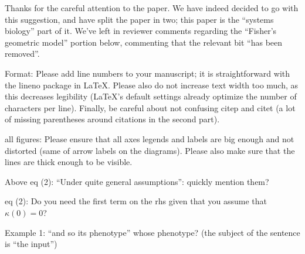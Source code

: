 Thanks for the careful attention to the paper.
We have indeed decided to go with this suggestion,
and have split the paper in two;
this paper is the ``systems biology'' part of it.
We've left in reviewer comments regarding the ``Fisher's geometric model'' portion below,
commenting that the relevant bit ``has been removed''.



\begin{point}{Format:}
    Please add line numbers to your manuscript; it is straightforward
with the lineno package in LaTeX.  Please also do not increase text width too
much, as this decreases legibility (LaTeX's default settings already optimize
the number of characters per line).  Finally, be careful about not confusing
citep and citet (a lot of missing parentheses around citations in the second part).
\end{point}


\begin{point}{all figures:}
    Please ensure that all axes legends and labels are big enough
and not distorted (same of arrow labels on the diagrams). Please also make sure
that the lines are thick enough to be visible.
\end{point}

\reply{
}

\begin{point}{Above eq (2):}
    ``Under quite general assumptions'': quickly mention them?
\end{point}


\begin{point}{eq (2):} 
    Do you need the first term on the rhs given that you assume that $\kappa(0)=0$?
\end{point}


\begin{point}{Example 1:}
    ``and so its phenotype'' whose phenotype? (the subject of the sentence is ``the input'')
\end{point}


